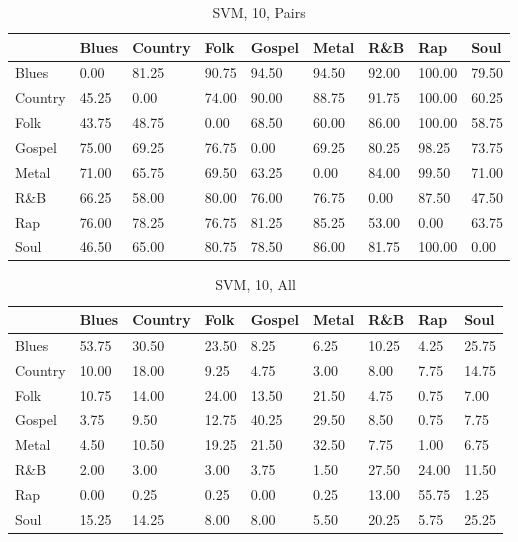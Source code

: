 \documentclass[a4paper,oneside]{article}
\begin{document}
\begin{table}[H]\centering
\caption{SVM, 10, Pairs}
\begin{tabu}{l|*{8}{l}}
 & Blues & Country & Folk & Gospel & Metal & R\&B & Rap & Soul \\ \hline
Blues & 0.00 & 81.25 & 90.75 & 94.50 & 94.50 & 92.00 & 100.00 & 79.50 \\
Country & 45.25 & 0.00 & 74.00 & 90.00 & 88.75 & 91.75 & 100.00 & 60.25 \\
Folk & 43.75 & 48.75 & 0.00 & 68.50 & 60.00 & 86.00 & 100.00 & 58.75 \\
Gospel & 75.00 & 69.25 & 76.75 & 0.00 & 69.25 & 80.25 & 98.25 & 73.75 \\
Metal & 71.00 & 65.75 & 69.50 & 63.25 & 0.00 & 84.00 & 99.50 & 71.00 \\
R\&B & 66.25 & 58.00 & 80.00 & 76.00 & 76.75 & 0.00 & 87.50 & 47.50 \\
Rap & 76.00 & 78.25 & 76.75 & 81.25 & 85.25 & 53.00 & 0.00 & 63.75 \\
Soul & 46.50 & 65.00 & 80.75 & 78.50 & 86.00 & 81.75 & 100.00 & 0.00
\end{tabu}
\end{table}

\begin{table}[H]\centering
\caption{SVM, 10, All}
\begin{tabu}{l|*{8}{l}}
 & Blues & Country & Folk & Gospel & Metal & R\&B & Rap & Soul \\ \hline
Blues & 53.75 & 30.50 & 23.50 & 8.25 & 6.25 & 10.25 & 4.25 & 25.75 \\
Country & 10.00 & 18.00 & 9.25 & 4.75 & 3.00 & 8.00 & 7.75 & 14.75 \\
Folk & 10.75 & 14.00 & 24.00 & 13.50 & 21.50 & 4.75 & 0.75 & 7.00 \\
Gospel & 3.75 & 9.50 & 12.75 & 40.25 & 29.50 & 8.50 & 0.75 & 7.75 \\
Metal & 4.50 & 10.50 & 19.25 & 21.50 & 32.50 & 7.75 & 1.00 & 6.75 \\
R\&B & 2.00 & 3.00 & 3.00 & 3.75 & 1.50 & 27.50 & 24.00 & 11.50 \\
Rap & 0.00 & 0.25 & 0.25 & 0.00 & 0.25 & 13.00 & 55.75 & 1.25 \\
Soul & 15.25 & 14.25 & 8.00 & 8.00 & 5.50 & 20.25 & 5.75 & 25.25 \\
\end{tabu}
\end{table}
\end{document}
